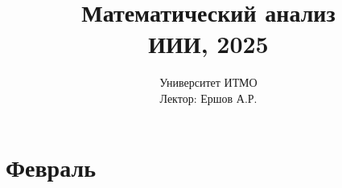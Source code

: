 \documentclass{article}
\author{}
\title{Математический анализ\\ИИИ, 2025}
\date{Университет ИТМО \\ Лектор: Ершов А.Р.}
\begin{document}
\maketitle

\tableofcontents

\newpage


\section{Февраль}


\end{document}
